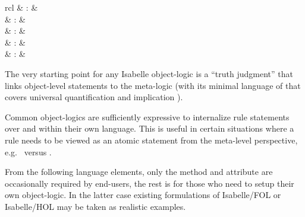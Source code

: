 \begin{isabellebody}
\begin{isamarkuptext}
\begin{descr}
  \end{descr}%
\end{isamarkuptext}%
\isamarkuptrue%
%
\isamarkuptrue%
%
\begin{isamarkuptext}%
\begin{matharray}{rcl}
    \hypertarget{command.judgment}{\hyperlink{command.judgment}{\mbox{}}} & : &  \\
    \hypertarget{method.atomize}{\hyperlink{method.atomize}{\mbox{}}} & : & \isarmeth \\
    \hypertarget{attribute.atomize}{\hyperlink{attribute.atomize}{\mbox{}}} & : & \isaratt \\
    \hypertarget{attribute.rule-format}{\hyperlink{attribute.rule-format}{\mbox{}}} & : & \isaratt \\
    \hypertarget{attribute.rulify}{\hyperlink{attribute.rulify}{\mbox{}}} & : & \isaratt \\
  \end{matharray}

  The very starting point for any Isabelle object-logic is a ``truth
  judgment'' that links object-level statements to the meta-logic
  (with its minimal language of  that covers universal
  quantification \isa{{\isachardoublequote}{\isasymAnd}{\isachardoublequote}} and implication \isa{{\isachardoublequote}{\isasymLongrightarrow}{\isachardoublequote}}).

  Common object-logics are sufficiently expressive to internalize rule
  statements over \isa{{\isachardoublequote}{\isasymAnd}{\isachardoublequote}} and \isa{{\isachardoublequote}{\isasymLongrightarrow}{\isachardoublequote}} within their own
  language.  This is useful in certain situations where a rule needs
  to be viewed as an atomic statement from the meta-level perspective,
  e.g.\  versus .

  From the following language elements, only the \hyperlink{method.atomize}{\mbox{}}
  method and \hyperlink{attribute.rule-format}{\mbox{}} attribute are occasionally
  required by end-users, the rest is for those who need to setup their
  own object-logic.  In the latter case existing formulations of
  Isabelle/FOL or Isabelle/HOL may be taken as realistic examples.


\end{isamarkuptext}
\end{isabellebody}
